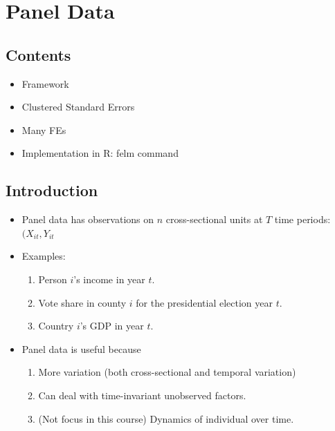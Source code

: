 \documentclass[]{book}
\providecommand{\tightlist}{%
  \setlength{\itemsep}{0pt}\setlength{\parskip}{0pt}}
\begin{document}
\chapter{Panel Data}\label{panel-data}

\section{Contents}\label{contents}

\begin{itemize}
\tightlist
\item
  Framework
\item
  Clustered Standard Errors
\item
  Many FEs
\item
  Implementation in R: felm command
\end{itemize}

\section{Introduction}\label{introduction-2}

\begin{itemize}
\tightlist
\item
  Panel data has observations on \(n\) cross-sectional units at \(T\)
  time periods: \((X_{it}, Y_{it}\)
\item
  Examples:

  \begin{enumerate}
  \def\labelenumi{\arabic{enumi}.}
  \tightlist
  \item
    Person \(i\)'s income in year \(t\).
  \item
    Vote share in county \(i\) for the presidential election year \(t\).
  \item
    Country \(i\)'s GDP in year \(t\).
  \end{enumerate}
\item
  Panel data is useful because

  \begin{enumerate}
  \def\labelenumi{\arabic{enumi}.}
  \tightlist
  \item
    More variation (both cross-sectional and temporal variation)
  \item
    Can deal with time-invariant unobserved factors.
  \item
    (Not focus in this course) Dynamics of individual over time.
  \end{enumerate}
\end{itemize}
\end{document}
